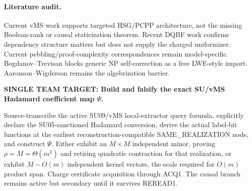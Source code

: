 \documentclass[11pt]{article}
\begin{document}
\paragraph{Literature audit.} Current vMS work supports targeted HSG/PCPP architecture, not the missing Boolean-rank or causal staticization theorem. Recent DQBF work confirms dependency structure matters but does not supply the charged uniformizer. Current pebbling/proof-complexity correspondences remain model-specific. Bogdanov--Trevisan blocks generic NP self-correction as a free LWE-style import. Aaronson--Wigderson remains the algebrization barrier.

\begin{candidatebox}
\textbf{SINGLE TEAM TARGET: Build and falsify the exact SU/vMS Hadamard coefficient map \(\Psi\).}

Source-transcribe the active SU09/vMS local-extractor query formula, explicitly declare the SU05-sanctioned Hadamard conversion, derive the actual label-bit functions at the earliest reconstruction-compatible SAME_REALIZATION node, and construct \(\Psi\). Either exhibit an \(M\times M\) independent minor, proving \(\rho=M=\Theta(m^2)\) and retiring quadratic contraction for that realization, or exhibit \(M-O(m)\) independent kernel vectors, the scale required for \(O(m)\) product span. Charge certificate acquisition through ACQ1. The causal branch remains active but secondary until it survives REREAD1.
\end{candidatebox}
\end{document}
